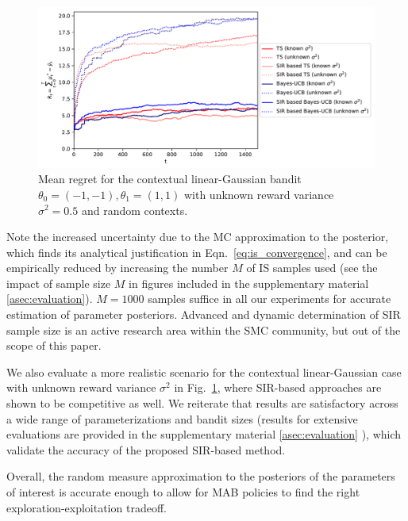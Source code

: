 \documentclass{article}
\def\addappendix{}
\begin{document}
\begin{figure}[!h]
	\begin{center}
		\centerline{\includegraphics[width=\textwidth]{./figs/static/linearGaussian/cumulative_regret_all}}
		\caption{Mean regret for the contextual linear-Gaussian bandit $\theta_0=(-1,-1),\theta_1=(1,1)$ with unknown reward variance $\sigma^2=0.5$ and random contexts.}
		\label{fig:static_bandits_linearGaussian_all}
	\end{center}
\vspace*{-0.5cm}
\end{figure}

Note the increased uncertainty due to the MC approximation to the posterior, which finds its analytical justification in Eqn.~\eqref{eq:is_convergence}, and can be empirically reduced by increasing the number $M$ of IS samples used (see the impact of sample size $M$ in figures included in
\ifx\addappendix\undefined the supplementary material \else \autoref{asec:evaluation}\fi). $M=1000$ samples suffice in all our experiments for accurate estimation of parameter posteriors. Advanced and dynamic determination of SIR sample size is an active research area within the SMC community, but out of the scope of this paper.

We also evaluate a more realistic scenario for the contextual linear-Gaussian case with unknown reward variance $\sigma^2$ in Fig.~\ref{fig:static_bandits_linearGaussian_all}, where SIR-based approaches are shown to be competitive as well. We reiterate that results are satisfactory across a wide range of parameterizations and bandit sizes (results for extensive evaluations are provided in \ifx\addappendix\undefined the supplementary material \else \autoref{asec:evaluation} \fi), which validate the accuracy of the proposed SIR-based method.

Overall, the random measure approximation to the posteriors of the parameters of interest is accurate enough to allow for MAB policies to find the right exploration-exploitation tradeoff.
\end{document}
